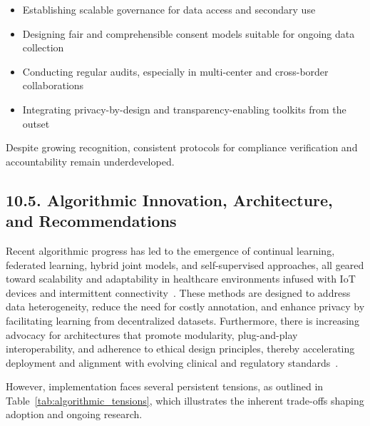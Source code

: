 \documentclass[11pt]{article}
\begin{document}
\begin{itemize}
    \item Establishing scalable governance for data access and secondary use
    \item Designing fair and comprehensible consent models suitable for ongoing data collection
    \item Conducting regular audits, especially in multi-center and cross-border collaborations
    \item Integrating privacy-by-design and transparency-enabling toolkits from the outset
\end{itemize}

Despite growing recognition, consistent protocols for compliance verification and accountability remain underdeveloped.

\subsection{10.5. Algorithmic Innovation, Architecture, and Recommendations}

Recent algorithmic progress has led to the emergence of continual learning, federated learning, hybrid joint models, and self-supervised approaches, all geared toward scalability and adaptability in healthcare environments infused with IoT devices and intermittent connectivity~\cite{ref36,ref37,ref42,ref43,ref46,ref50,ref54,ref61,ref65,ref70,ref71,ref72,ref74,ref75,ref76,ref77,ref78,ref79,ref90,ref104,ref105,ref107}. These methods are designed to address data heterogeneity, reduce the need for costly annotation, and enhance privacy by facilitating learning from decentralized datasets. Furthermore, there is increasing advocacy for architectures that promote modularity, plug-and-play interoperability, and adherence to ethical design principles, thereby accelerating deployment and alignment with evolving clinical and regulatory standards~\cite{ref7,ref11,ref12,ref13,ref14,ref16,ref17,ref18,ref19,ref20,ref21,ref22,ref23,ref24,ref25,ref28,ref30,ref32,ref33,ref34,ref35,ref41,ref43,ref44,ref45,ref46,ref49,ref50,ref60,ref61,ref62,ref63,ref64,ref65,ref70,ref71,ref72,ref73,ref74,ref75,ref76,ref77,ref78,ref79,ref80,ref84,ref106,ref107}.

However, implementation faces several persistent tensions, as outlined in Table~\ref{tab:algorithmic_tensions}, which illustrates the inherent trade-offs shaping adoption and ongoing research.
\end{document}

